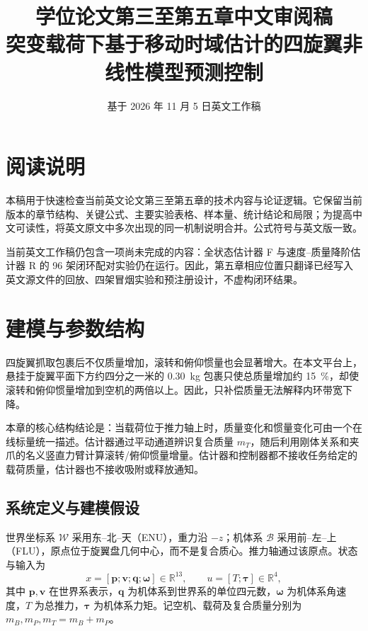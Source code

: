 \documentclass[11pt,UTF8,fontset=none]{ctexrep}
\title{学位论文第三至第五章中文审阅稿\\[4pt]
\large 突变载荷下基于移动时域估计的四旋翼非线性模型预测控制}
\author{}
\date{基于 2026 年 11 月 5 日英文工作稿}
\providecommand{\mB}{m_B}
\providecommand{\mP}{m_P}
\providecommand{\mT}{m_T}
\begin{document}
\maketitle
\tableofcontents

\chapter*{阅读说明}
本稿用于快速检查当前英文论文第三至第五章的技术内容与论证逻辑。它保留当前版本的章节结构、关键公式、主要实验表格、样本量、统计结论和局限；为提高中文可读性，将英文原文中多次出现的同一机制说明合并。公式符号与英文版一致。

当前英文工作稿仍包含一项尚未完成的内容：全状态估计器 F 与速度--质量降阶估计器 R 的 96 架闭环配对实验仍在运行。因此，第五章相应位置只翻译已经写入英文源文件的回放、四架冒烟实验和预注册设计，不虚构闭环结果。

\setcounter{chapter}{2}
\chapter{建模与参数结构}

四旋翼抓取包裹后不仅质量增加，滚转和俯仰惯量也会显著增大。在本文平台上，悬挂于旋翼平面下方约四分之一米的 \SI{0.30}{\kg} 包裹只使总质量增加约 \SI{15}{\percent}，却使滚转和俯仰惯量增加到空机的两倍以上。因此，只补偿质量无法解释内环带宽下降。

本章的核心结构结论是：当载荷位于推力轴上时，质量变化和惯量变化可由一个在线标量统一描述。估计器通过平动通道辨识复合质量 $\mT$，随后利用刚体关系和夹爪的名义竖直力臂计算滚转/俯仰惯量增量。估计器和控制器都不接收任务给定的载荷质量，估计器也不接收吸附或释放通知。

\section{系统定义与建模假设}

世界坐标系 $\mathcal W$ 采用东--北--天（ENU），重力沿 $-z$；机体系 $\mathcal B$ 采用前--左--上（FLU），原点位于旋翼盘几何中心，而不是复合质心。推力轴通过该原点。状态与输入为
\begin{equation}
x=[\bm p;\bm v;\bm q;\bm\omega]\in\mathbb R^{13},\qquad
u=[T;\bm\tau]\in\mathbb R^4,
\end{equation}
其中 $\bm p,\bm v$ 在世界系表示，$\bm q$ 为机体系到世界系的单位四元数，$\bm\omega$ 为机体系角速度，$T$ 为总推力，$\bm\tau$ 为机体系力矩。记空机、载荷及复合质量分别为 $\mB,\mP,\mT=\mB+\mP$。
\end{document}
